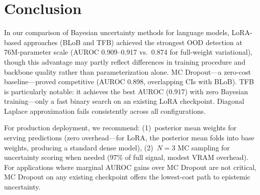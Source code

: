 \documentclass{article}
\begin{document}
\section{Conclusion}
\label{sec:conclusion}

In our comparison of Bayesian uncertainty methods for language models, LoRA-based approaches (BLoB and TFB) achieved the strongest OOD detection at 76M-parameter scale (AUROC 0.909--0.917 vs.\ 0.874 for full-weight variational), though this advantage may partly reflect differences in training procedure and backbone quality rather than parameterization alone. MC Dropout---a zero-cost baseline---proved competitive (AUROC 0.898, overlapping CIs with BLoB). TFB is particularly notable: it achieves the best AUROC (0.917) with zero Bayesian training---only a fast binary search on an existing LoRA checkpoint. Diagonal Laplace approximation fails consistently across all configurations.

For production deployment, we recommend: (1)~posterior mean weights for serving predictions (zero overhead---for LoRA, the posterior mean folds into base weights, producing a standard dense model), (2)~$N{=}3$ MC sampling for uncertainty scoring when needed (97\% of full signal, modest VRAM overhead). For applications where marginal AUROC gains over MC Dropout are not critical, MC Dropout on any existing checkpoint offers the lowest-cost path to epistemic uncertainty.



\end{document}
